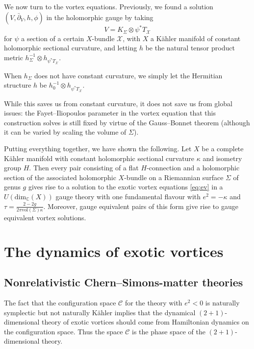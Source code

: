 \documentclass[10pt]{article}
\newcommand{\mc}[1]{\mathcal{#1}}
\newcommand{\db}{\bar{\partial}}
\theoremstyle{definition}
\begin{document}
We now turn to the vortex equations. Previously, we found a solution \((V, \db_V, h ,\phi)\) in the holomorphic gauge by taking 
\[
V = K_\Sigma \otimes \psi^*T_\mc{X}
\]
for \(\psi\) a section of a certain \(X\)-bundle \(\mc{X}\), with \(X\) a K\"ahler manifold of constant holomorphic sectional curvature, and letting \(h\) be the natural tensor product metric \(h_\Sigma^{-1} \otimes h_{\psi^*T_\mc{X}}\).

When \(h_\Sigma\) does not have constant curvature, we simply let the Hermitian structure \(h\) be \(h_0^{-1} \otimes h_{\psi^*T_\mc{X}}\).  

While this saves us from constant curvature, it does not save us from global issues: the Fayet--Iliopoulos parameter in the vortex equation that this construction solves is still fixed by virtue of the Gauss--Bonnet theorem (although it can be varied by scaling the volume of \(\Sigma\)).

Putting everything together, we have shown the following. Let \(X\) be a complete K\"ahler manifold with constant holomorphic sectional curvature \(\kappa\) and isometry group \(H\). Then every pair consisting of a flat \(H\)-connection and a holomorphic section of the associated holomorphic \(X\)-bundle on a Riemannian surface \(\Sigma\) of genus \(g\) gives rise to a solution to the exotic vortex equations \eqref{eq:ev} in a \(U(\text{dim}_\mathbb{C}(X))\) gauge theory with one fundamental flavour with \(e^2 = -\kappa\) and \(\tau = \frac{2-2g}{2\pi \text{vol}(\Sigma) \kappa}\). Moreover, gauge equivalent pairs of this form give rise to gauge equivalent vortex solutions. 


\section{The dynamics of exotic vortices}
\label{sec:dyn}

\subsection{Nonrelativistic Chern--Simons-matter theories}

The fact that the configuration space \(\mc{C}\) for the theory with \(e^2<0\) is naturally symplectic but not naturally K\"ahler implies that the dynamical \((2+1)\)-dimensional theory of exotic vortices should come from Hamiltonian dynamics on the configuration space. Thus the space \(\mc{C}\) is  the phase space of the \((2+1)\)-dimensional theory. 
\end{document}
